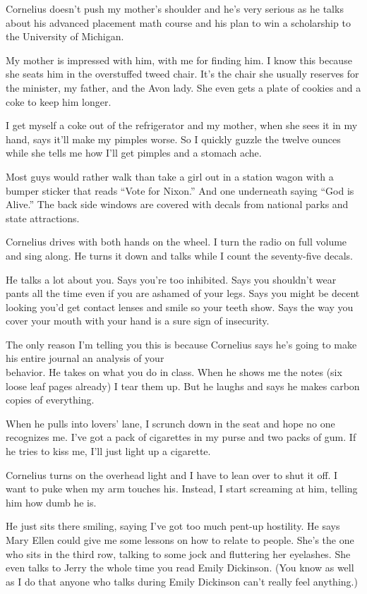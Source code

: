 \documentclass[twoside,10pt]{book}
\begin{document}
Cornelius doesn't push my mother's shoulder and he's very serious as he
talks about his advanced placement math course and his plan to win a
scholarship to the University of Michigan.

My mother is impressed with him, with me for finding him. I know this
because she seats him in the overstuffed tweed chair. It's the chair she
usually reserves for the minister, my father, and the Avon lady. She
even gets a plate of cookies and a coke to keep him longer.

I get myself a coke out of the refrigerator and my mother, when she sees
it in my hand, says it'll make my pimples worse. So I quickly guzzle the
twelve ounces while she tells me how I'll get pimples and a stomach
ache.

Most guys would rather walk than take a girl out in a station wagon with
a bumper sticker that reads ``Vote for Nixon.'' And one underneath
saying ``God is Alive.'' The back side windows are cov­ered with decals
from national parks and state attractions.

Cornelius drives with both hands on the wheel. I turn the radio on full
volume and sing along. He turns it down and talks while I count the
seventy-five decals.

He talks a lot about you. Says you're too inhibited. Says you shouldn't
wear pants all the time even if you are ashamed of your legs. Says you
might be decent looking you'd get contact lenses and smile so your teeth
show. Says the way you cover your mouth with your hand is a sure sign of
insecurity.

The only reason I'm telling you this is because Cornelius says he's
going to make his entire journal an analysis of your\\
behavior. He takes on what you do in class. When he shows me the notes
(six loose leaf pages already) I tear them up. But he laughs and says he
makes carbon copies of every­thing.

When he pulls into lovers' lane, I scrunch down in the seat and hope no
one recognizes me. I've got a pack of cigarettes in my purse and two
packs of gum. If he tries to kiss me, I'll just light up a cigarette.

Cornelius turns on the overhead light and I have to lean over to shut it
off. I want to puke when my arm touches his. Instead, I start screaming
at him, telling him how dumb he is.

He just sits there smiling, saying I've got too much pent-up hostility.
He says Mary Ellen could give me some lessons on how to relate to
people. She's the one who sits in the third row, talking to some jock
and fluttering her eyelashes. She even talks to Jerry the whole time you
read Emily Dickin­son. (You know as well as I do that anyone who talks
during Emily Dickinson can't really feel anything.)
\end{document}
